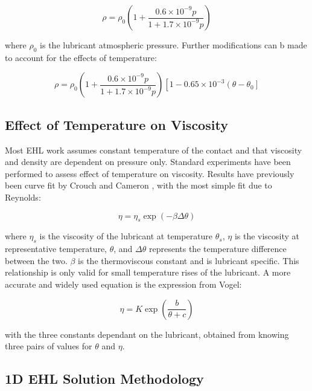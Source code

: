 \begin{equation}\label{eq3.29}
	\rho=\rho_0\left(1+\frac{0.6 \times 10^{-9} p}{1+1.7 \times 10^{-9} p}\right)
\end{equation}

where $\rho_0$ is the lubricant atmospheric pressure. Further modifications can b made to account for the effects of temperature:

\begin{equation}\label{eq3.30}
	\rho=\rho_0\left(1+\frac{0.6 \times 10^{-9} p}{1+1.7 \times 10^{-9} p}\right)\left[1-0.65 \times 10^{-3}\left(\theta-\theta_0\right]\right.
\end{equation}


\subsection{Effect of Temperature on Viscosity}

Most EHL work assumes constant temperature of the contact and that viscosity and density are dependent on pressure only. Standard experiments have been performed to assess effect of temperature on viscosity. Results have previously been curve fit by Crouch and Cameron \cite{Crouch1961}, with the most simple fit due to Reynolds:

\begin{equation}\label{eq3.31}
	\eta=\eta_s \exp (-\beta \Delta \theta)
\end{equation}

where $\eta_s$ is the viscosity of the lubricant at temperature $\theta_s$, $\eta$ is the viscosity at representative temperature, $\theta$, and $\Delta \theta$ represents the temperature difference between the two. $\beta$ is the thermoviscous constant and is lubricant specific. This relationship is only valid for small temperature rises of the lubricant. A more accurate and widely used equation is the expression from Vogel:

\begin{equation}\label{eq3.32}
	\eta=K \exp \left(\frac{b}{\theta+c}\right)
\end{equation}

with the three constants dependant on the lubricant, obtained from knowing three pairs of values for $\theta$ and $\eta$.

\subsection{1D EHL Solution Methodology}

